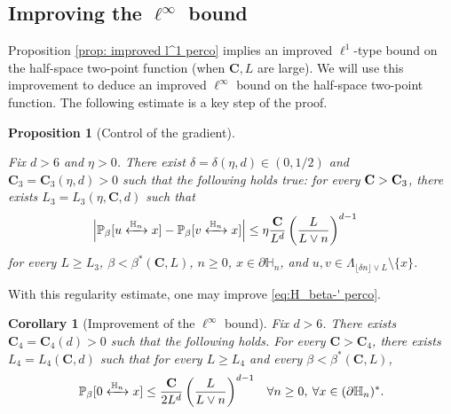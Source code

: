 \documentclass[11pt,a4paper]{article}
\numberwithin{equation}{section}
\theoremstyle{plain}
\newtheorem{Cor}[Thm]{Corollary}
\newtheorem{Prop}[Thm]{Proposition}
\theoremstyle{definition}
\newcommand\bfC{\mathbf{C}}
\newcommand{\connect}{\xleftrightarrow}
\begin{document}
\subsection{Improving the $\ell^\infty$ bound}
Proposition \ref{prop: improved l^1 perco} implies an improved $\ell^1$-type bound on the half-space two-point function (when $\bfC,L$ are large). We will use this improvement to deduce an improved $\ell^\infty$ bound on the half-space two-point function. 
The following estimate is a key step of the proof.
\begin{Prop}[Control of the gradient]\label{prop:regularity perco}

Fix $d>6$ and $\eta>0$. There exist $\delta=\delta(\eta,d)\in(0,1/2)$ and $\bfC_3=\bfC_3(\eta,d)>0$ such that the following holds true: for every ${\bf C}>\bfC_3$, there exists $L_3=L_3(\eta,\bfC,d)$ such that 
\begin{align}\label{eq:gradient estimate}
\Big|\mathbb P_\beta[u\connect{\mathbb H_n\:}x]-\mathbb P_\beta[v\connect{\mathbb H_n\:}x]\Big|&\le \eta\frac{\bfC}{L^d}\left(\frac{L}{L\vee n}\right)^{d-1}
\end{align}
for every $L\geq L_3$, $\beta<\beta^*(\bfC,L)$, $n\geq 0$,  $x\in \partial\mathbb H_n$, and  $u,v\in \Lambda_{\lfloor \delta n\rfloor\vee L}\setminus\{x\}$.
\end{Prop}
With this regularity estimate, one may improve \eqref{eq:H_beta-' perco}. \begin{Cor}[Improvement of the $\ell^\infty$ bound]\label{prop: improve l inf perco} Fix $d>6$. There exists $\bfC_4=\bfC_4(d)>0$ such that the following holds. For every $\bfC>\bfC_4$, there exists $L_4=L_4(\bfC,d)$ such that for every $L\geq L_4$ and every $\beta<\beta^*(\bfC,L)$,
\begin{align}
\mathbb P_\beta[0\connect{\mathbb H_n\:}x]&\le \frac{\bfC}{2L^d}\left(\frac{L}{L\vee n}\right)^{d-1}&\forall n\geq 0,\:\forall x\in (\partial\mathbb H_n)^*.
\end{align}
\end{Cor}
\end{document}
